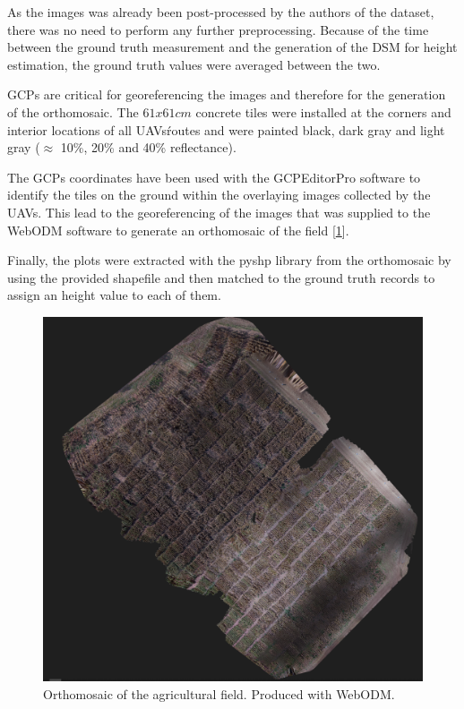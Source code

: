 As the images was already been post-processed by the authors of the dataset, there was no need to perform any further preprocessing.
Because of the time between the ground truth measurement and the generation of the DSM for height estimation, the ground truth values were averaged between the two.

GCPs are critical for georeferencing the images and therefore for the generation of the orthomosaic. The $61x61cm$ concrete tiles were installed at the corners and interior locations of all UAVs\' routes and were painted black, dark gray and light gray ($\approx$ 10\%, 20\% and 40\% reflectance).

The GCPs coordinates have been used with the GCPEditorPro software to identify the tiles on the ground within the overlaying images collected by the UAVs.
This lead to the georeferencing of the images that was supplied to the WebODM software to generate an orthomosaic of the field [\ref{fig:orthomosaic}].

Finally, the plots were extracted with the pyshp library from the orthomosaic by using the provided shapefile and then matched to the ground truth records to assign an height value to each of them.

\begin{figure}[b!]
    \includegraphics[width=\linewidth]{../images/orthomosaic} 
    \caption{Orthomosaic of the agricultural field. Produced with WebODM.}
    \label{fig:orthomosaic}
\end{figure}